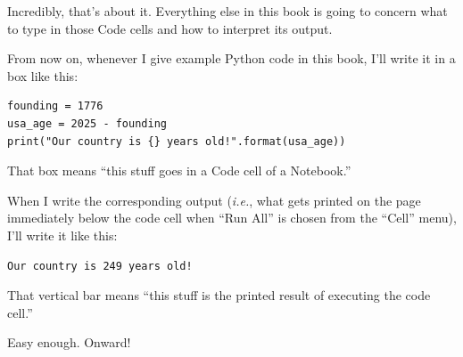 Incredibly, that's about it. Everything else in this book is going to concern
what to type in those Code cells and how to interpret its output.

From now on, whenever I give example Python code in this book, I'll write it in
a box like this:

\begin{Verbatim}[fontsize=\small,samepage=true,frame=single,framesep=3mm]
founding = 1776
usa_age = 2025 - founding
print("Our country is {} years old!".format(usa_age))
\end{Verbatim}

That box means ``this stuff goes in a Code cell of a Notebook.''

When I write the corresponding output (\textit{i.e.}, what gets printed on the
page immediately below the code cell when ``Run All'' is chosen from the
``Cell'' menu), I'll write it like this:
  
\begin{Verbatim}[fontsize=\small,samepage=true,frame=leftline,framesep=5mm,framerule=1mm]
Our country is 249 years old!
\end{Verbatim}

That vertical bar means ``this stuff is the printed result of executing the
code cell.''

Easy enough. Onward!
